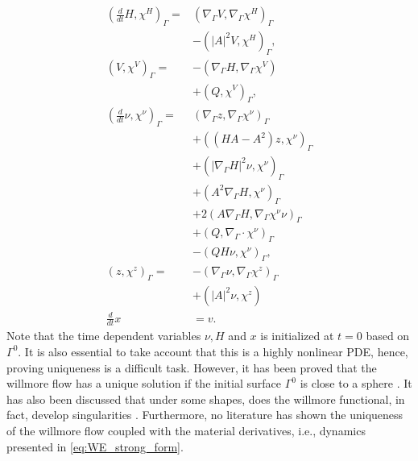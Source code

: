 \begin{subequations}
\label{eq:WE_weak_form}
\begin{align}
\left( \frac{d}{dt}H, \chi ^{H} \right)_{\Gamma } =&  \left( \nabla _{\Gamma } V, \nabla _{\Gamma }\chi ^{H} \right) _{\Gamma } \nonumber \\
                                                   &- \left( \left\lvert A \right\rvert ^2 V, \chi ^{H} \right) _{\Gamma },   \\
\left( V, \chi ^{V} \right)_{\Gamma } =& -\left( \nabla _{\Gamma } H, \nabla _{\Gamma } \chi ^{V} \right) \nonumber \\
 & + \left( Q, \chi ^{V} \right)_{\Gamma },   \\
\left( \frac{d}{dt} \nu , \chi ^{\nu } \right)_{\Gamma } =& \left( \nabla _{\Gamma }z, \nabla _{\Gamma } \chi ^{\nu } \right) _{\Gamma }\nonumber   \\
 & + \left( ( HA - A^2  )z,\chi^\nu  \right)_{\Gamma }   \nonumber \\
 & + \left( \left\lvert \nabla _{\Gamma } H \right\rvert^2 \nu , \chi ^{\nu }  \right)_{\Gamma} \nonumber  \\
 & + \left(  A^2\nabla _{\Gamma } H, \chi ^{\nu }  \right)_{\Gamma} \nonumber  \\
 & + 2 \left( A \nabla _{\Gamma } H, \nabla _{\Gamma } \chi ^{\nu } \nu  \right)_{\Gamma} \nonumber    \\
 &  + \left( Q, \nabla _{\Gamma } \cdot \chi ^{\nu }  \right)_{\Gamma } \nonumber  \\
  &- \left( QH\nu , \chi ^{\nu } \right) _{\Gamma},\\
\left( z, \chi ^{z} \right) _{\Gamma }  =& - \left( \nabla _{\Gamma } \nu , \nabla _{\Gamma } \chi ^{z} \right)_{\Gamma} \nonumber \\
 & + \left( \left\lvert A \right\rvert ^2 \nu , \chi ^{z} \right) \\
\frac{d}{dt}x &= v
.\end{align}
\end{subequations}
Note that the time dependent variables $\nu, H $ and $x$ is initialized at $t=0$  based on $\Gamma ^{0}$. It is also essential to take account that this is a highly nonlinear PDE, hence, proving uniqueness is a difficult task. However, it has been
proved that the willmore flow has a unique solution if the initial surface $ \Gamma ^{0} $ is close to a sphere \cite{simonett2001willmore}. It has also been discussed that under some shapes, does the willmore functional, in fact, develop
singularities \cite{mayer2002numerical}. Furthermore, no literature has shown the uniqueness of the willmore flow coupled with the material derivatives, i.e., dynamics presented in \eqref{eq:WE_strong_form}.














